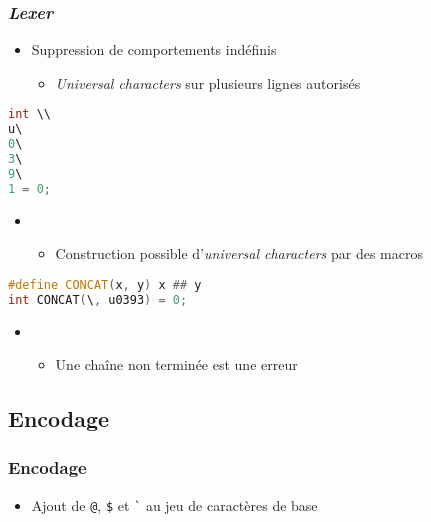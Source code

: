 \documentclass[C++.tex]{subfiles}
\begin{document}
\begin{frame}[fragile]
	\frametitle{\textit{Lexer}}
	\begin{itemize}
		\item Suppression de comportements indéfinis
		\begin{itemize}
			\item \textit{Universal characters} sur plusieurs lignes autorisés
		\end{itemize}
	\end{itemize}
	
	\begin{lstlisting}[language=C++]
int \\
u\
0\
3\
9\
1 = 0;\end{lstlisting}

	\begin{itemize}
		\item [] \begin{itemize}
			\item Construction possible d'\textit{universal characters} par des macros
		\end{itemize}
	\end{itemize}

	\begin{lstlisting}[language=C++]
#define CONCAT(x, y) x ## y
int CONCAT(\, u0393) = 0;\end{lstlisting}

	\begin{itemize}
		\item [] \begin{itemize}
			\item Une chaîne non terminée est une erreur
		\end{itemize}
	\end{itemize}
\end{frame}

\subsection*{Encodage}
\begin{frame}[fragile]
	\frametitle{Encodage}
	\begin{itemize}
		\item Ajout de \lstinline|@|, \lstinline|$| et \lstinline|`| au jeu de caractères de base
	
	\end{itemize}
\end{frame}
\end{document}
